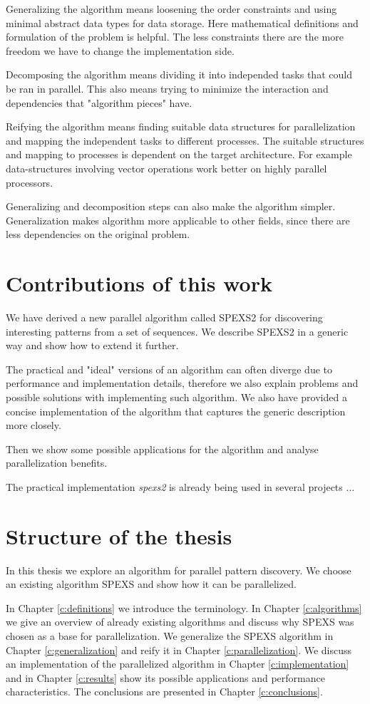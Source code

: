 Generalizing the algorithm means loosening the order constraints and using minimal abstract data types for data storage. Here mathematical definitions and formulation of the problem is helpful. The less constraints there are the more freedom we have to change the implementation side.

Decomposing the algorithm means dividing it into independed tasks that could be ran in parallel. This also means trying to minimize the interaction and dependencies that "algorithm pieces" have.

Reifying the algorithm means finding suitable data structures for parallelization and mapping the independent tasks to different processes. The suitable structures and mapping to processes is dependent on the target architecture. For example data-structures involving vector operations work better on highly parallel processors.

Generalizing and decomposition steps can also make the algorithm simpler. Generalization makes algorithm more applicable to other fields, since there are less dependencies on the original problem.

\section{Contributions of this work}

We have derived a new parallel algorithm called SPEXS2 for discovering interesting patterns from a set of sequences. We describe SPEXS2 in a generic way and show how to extend it further. 

The practical and "ideal" versions of an algorithm can often diverge due to performance and implementation details, therefore we also explain problems and possible solutions with implementing such algorithm. We also have provided a concise implementation of the algorithm that captures the generic description more closely.

Then we show some possible applications for the algorithm and analyse parallelization benefits.

The practical implementation \emph{spexs2} is already being used in several projects ... 

\section{Structure of the thesis}

In this thesis we explore an algorithm for parallel pattern discovery. We choose an existing algorithm SPEXS\cite{spexs} and show how it can be parallelized.

In Chapter \ref{c:definitions} we introduce the terminology. In Chapter \ref{c:algorithms} we give an overview of already existing algorithms and discuss why SPEXS\cite{spexs} was chosen as a base for parallelization. We generalize the SPEXS algorithm in Chapter \ref{c:generalization} and reify it in Chapter \ref{c:parallelization}. We discuss an implementation of the parallelized algorithm in Chapter \ref{c:implementation} and in Chapter \ref{c:results} show its possible applications and performance characteristics. The conclusions are presented in Chapter \ref{c:conclusions}.
